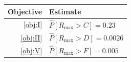 \begin{tabularx}{\linewidth}{r>{\centering\arraybackslash}X}
\toprule  Objective & Estimate\\\midrule
  \ref{obj:I} & $\hat{P}[R_{\max} > C] = 0.23$\\\addlinespace
  \ref{obj:II} & $\hat{P}[R_{\max} > D] = 0.0026$\\\addlinespace
  \ref{obj:V} & $\hat{P}[R_{\max} > F] = 0.005$\\\bottomrule
\end{tabularx}